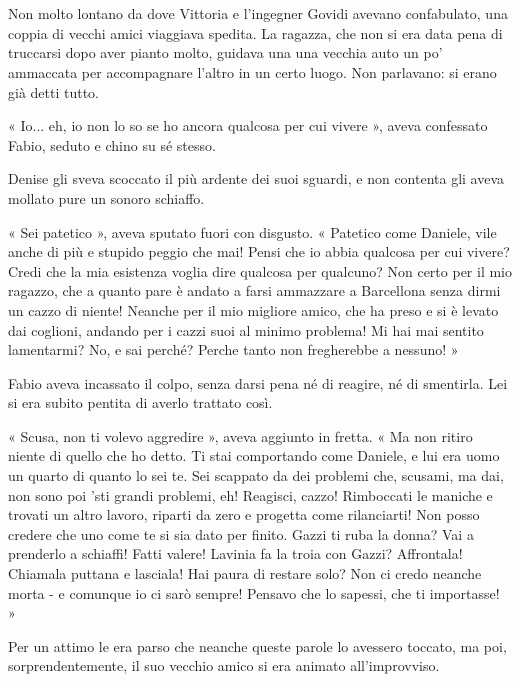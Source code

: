 \chapter{}

Non molto lontano da dove Vittoria e l'ingegner Govidi avevano confabulato, una coppia di vecchi amici viaggiava spedita. La ragazza, che non si era data pena di truccarsi dopo aver pianto molto, guidava una una vecchia auto un po' ammaccata per accompagnare l'altro in un certo luogo. Non parlavano: si erano già detti tutto.

« Io... eh, io non lo so se ho ancora qualcosa per cui vivere », aveva confessato Fabio, seduto e chino su sé stesso.

Denise gli sveva scoccato il più ardente dei suoi sguardi, e non contenta gli aveva mollato pure un sonoro schiaffo.

« Sei patetico », aveva sputato fuori con disgusto. « Patetico come Daniele, vile anche di più e stupido peggio che mai! Pensi che io abbia qualcosa per cui vivere? Credi che la mia esistenza voglia dire qualcosa per qualcuno? Non certo per il mio ragazzo, che a quanto pare è andato a farsi ammazzare a Barcellona senza dirmi un cazzo di niente! Neanche per il mio migliore amico, che ha preso e si è levato dai coglioni, andando per i cazzi suoi al minimo problema! Mi hai mai sentito lamentarmi? No, e sai perché? Perche tanto non fregherebbe a nessuno! »

Fabio aveva incassato il colpo, senza darsi pena né di reagire, né di smentirla. Lei si era subito pentita di averlo trattato così.

« Scusa, non ti volevo aggredire », aveva aggiunto in fretta. « Ma non ritiro niente di quello che ho detto. Ti stai comportando come Daniele, e lui era uomo un quarto di quanto lo sei te. Sei scappato da dei problemi che, scusami, ma dai, non sono poi 'sti grandi problemi, eh! Reagisci, cazzo! Rimboccati le maniche e trovati un altro lavoro, riparti da zero e progetta come rilanciarti! Non posso credere che uno come te si sia dato per finito. Gazzi ti ruba la donna? Vai a prenderlo a schiaffi! Fatti valere! Lavinia fa la troia con Gazzi? Affrontala! Chiamala puttana e lasciala! Hai paura di restare solo? Non ci credo neanche morta - e comunque io ci sarò sempre! Pensavo che lo sapessi, che ti importasse! »

Per un attimo le era parso che neanche queste parole lo avessero toccato, ma poi, sorprendentemente, il suo vecchio amico si era animato all'improvviso.


